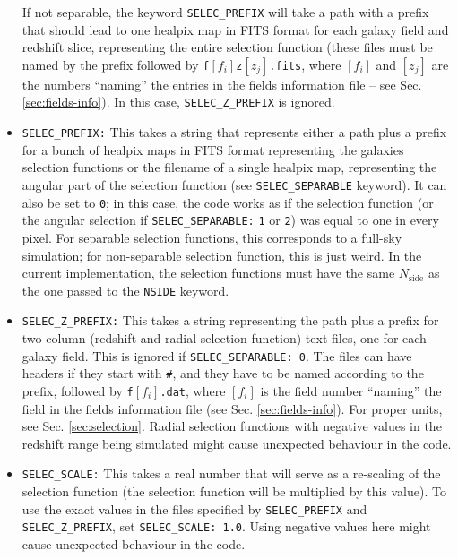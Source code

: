 \documentclass[12pt]{book} %
\newcommand{\nv}[1]{\mathrm{#1}}                 %
\begin{document}
\begin{itemize}
  If not separable, the keyword {\tt SELEC\_PREFIX} will take a path with a prefix that 
  should lead to one {\sc healpix} map in FITS format for each galaxy field and redshift slice, 
  representing the entire selection function (these files must be named by the prefix followed by 
  {\tt f}$[f_i]${\tt z}$[z_j]${\tt .fits}, where $[f_i]$ and $[z_j]$ are the numbers ``naming'' 
  the entries in the fields information file -- see Sec. \ref{sec:fields-info}). 
  In this case, {\tt SELEC\_Z\_PREFIX} is ignored.

\item {\tt SELEC\_PREFIX:} This takes a string that represents either a path plus a prefix for 
  a bunch of {\sc healpix} maps in FITS format representing the galaxies selection functions 
  or the filename of a single {\sc healpix} map, representing the angular 
  part of the selection function (see {\tt SELEC\_SEPARABLE} keyword). It can also be set to 
  {\tt 0}; in this case, the code works as if the selection function (or the angular selection 
  if {\tt SELEC\_SEPARABLE:} {\tt 1} or {\tt 2}) was equal to one in every pixel. For separable selection functions, 
  this corresponds to a full-sky simulation; for non-separable selection function, this is just weird. 
  In the current implementation, the selection functions must have the same $N_{\nv{side}}$ as the one 
  passed to the {\tt NSIDE} keyword.

\item {\tt SELEC\_Z\_PREFIX:} This takes a string representing the path plus a prefix for 
  two-column (redshift and radial selection function) text files, one for each galaxy field. 
  This is ignored if {\tt SELEC\_SEPARABLE: 0}. The files can have headers if they start with {\tt \#}, 
  and they have to be named according to the prefix, followed by {\tt f}$[f_i]${\tt .dat}, where 
  $[f_i]$ is the field number ``naming'' the field in the fields information file (see Sec. 
  \ref{sec:fields-info}). For proper units, see Sec. \ref{sec:selection}. Radial selection functions 
  with negative values in the redshift range being simulated might cause unexpected behaviour in the code.

 \item {\tt SELEC\_SCALE:} This takes a real number that will serve as a re-scaling of the selection 
   function (the selection function will be multiplied by this value). To use the exact values in the 
   files specified by {\tt SELEC\_PREFIX} and {\tt SELEC\_Z\_PREFIX}, set {\tt SELEC\_SCALE: 1.0}. 
   Using negative values here might cause unexpected behaviour in the code.  


\end{itemize}
\end{document}
